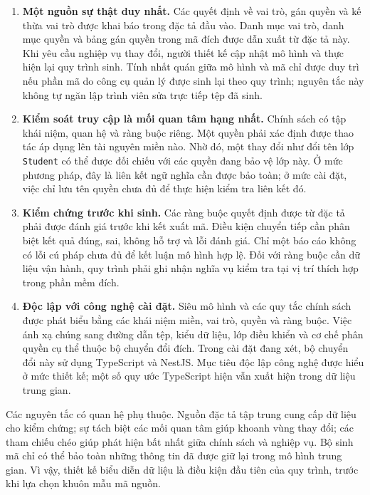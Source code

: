 \begin{enumerate}[leftmargin=1.8em,itemsep=5pt]
  \item \textbf{Một nguồn sự thật duy nhất.} Các quyết định về vai trò, gán quyền và kế thừa vai trò được khai báo trong đặc tả đầu vào. Danh mục vai trò, danh mục quyền và bảng gán quyền trong mã đích được dẫn xuất từ đặc tả này. Khi yêu cầu nghiệp vụ thay đổi, người thiết kế cập nhật mô hình và thực hiện lại quy trình sinh. Tính nhất quán giữa mô hình và mã chỉ được duy trì nếu phần mã do công cụ quản lý được sinh lại theo quy trình; nguyên tắc này không tự ngăn lập trình viên sửa trực tiếp tệp đã sinh.
  \item \textbf{Kiểm soát truy cập là mối quan tâm hạng nhất.} Chính sách có tập khái niệm, quan hệ và ràng buộc riêng. Một quyền phải xác định được thao tác áp dụng lên tài nguyên miền nào. Nhờ đó, một thay đổi như đổi tên lớp \texttt{Student} có thể được đối chiếu với các quyền đang bảo vệ lớp này. Ở mức phương pháp, đây là liên kết ngữ nghĩa cần được bảo toàn; ở mức cài đặt, việc chỉ lưu tên quyền chưa đủ để thực hiện kiểm tra liên kết đó.
  \item \textbf{Kiểm chứng trước khi sinh.} Các ràng buộc quyết định được từ đặc tả phải được đánh giá trước khi kết xuất mã. Điều kiện chuyển tiếp cần phân biệt kết quả đúng, sai, không hỗ trợ và lỗi đánh giá. Chỉ một báo cáo không có lỗi cú pháp chưa đủ để kết luận mô hình hợp lệ. Đối với ràng buộc cần dữ liệu vận hành, quy trình phải ghi nhận nghĩa vụ kiểm tra tại vị trí thích hợp trong phần mềm đích.
  \item \textbf{Độc lập với công nghệ cài đặt.} Siêu mô hình và các quy tắc chính sách được phát biểu bằng các khái niệm miền, vai trò, quyền và ràng buộc. Việc ánh xạ chúng sang đường dẫn tệp, kiểu dữ liệu, lớp điều khiển và cơ chế phân quyền cụ thể thuộc bộ chuyển đổi đích. Trong cài đặt đang xét, bộ chuyển đổi này sử dụng TypeScript và NestJS. Mục tiêu độc lập công nghệ được hiểu ở mức thiết kế; một số quy ước TypeScript hiện vẫn xuất hiện trong dữ liệu trung gian.
\end{enumerate}

Các nguyên tắc có quan hệ phụ thuộc. Nguồn đặc tả tập trung cung cấp dữ liệu cho kiểm chứng; sự tách biệt các mối quan tâm giúp khoanh vùng thay đổi; các tham chiếu chéo giúp phát hiện bất nhất giữa chính sách và nghiệp vụ. Bộ sinh mã chỉ có thể bảo toàn những thông tin đã được giữ lại trong mô hình trung gian. Vì vậy, thiết kế biểu diễn dữ liệu là điều kiện đầu tiên của quy trình, trước khi lựa chọn khuôn mẫu mã nguồn.

